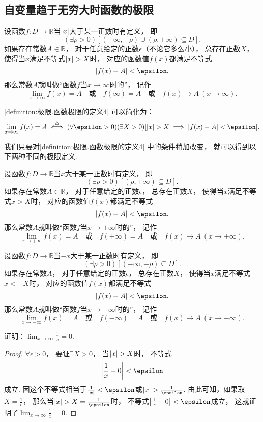 \subsection{自变量趋于无穷大时函数的极限}
\begin{definition}\label{definition:极限.函数极限的定义4}
设函数\(f\colon D\to\mathbb{R}\)当\(\abs{x}\)大于某一正数时有定义，
即\[
	(\exists\rho>0)
	[(-\infty,-\rho)\cup(\rho,+\infty) \subseteq D].
\]
如果存在常数\(A\in\mathbb{R}\)，
对于任意给定的正数\(\epsilon\)（不论它多么小），
总存在正数\(X\)，
使得当\(x\)满足不等式\(\abs{x} > X\)时，
对应的函数值\(f(x)\)都满足不等式\[
	\abs{f(x) - A} < \epsilon,
\]
那么常数\(A\)就叫做“函数\(f\)当\(x \to \infty\)时的”，
记作\[
	\lim_{x \to \infty} f(x) = A
	\quad\text{或}\quad
	f(\infty) = A
	\quad\text{或}\quad
	f(x) \to A\ (x \to \infty).
\]
\end{definition}
\cref{definition:极限.函数极限的定义4} 可以简化为：\[
	\lim_{x\to\infty} f(x) = A
	\defiff
	(\forall\epsilon>0)
	(\exists X>0)
	[
		\abs{x} > X
		\implies
		\abs{f(x) - A} < \epsilon
	].
\]

我们只要对\cref{definition:极限.函数极限的定义4} 中的条件稍加改变，
就可以得到以下两种不同的极限定义.
\begin{definition}\label{definition:极限.函数极限的定义5}
设函数\(f\colon D\to\mathbb{R}\)当\(x\)大于某一正数时有定义，
即\[
	(\exists\rho>0)
	[(\rho,+\infty) \subseteq D].
\]
如果存在常数\(A\in\mathbb{R}\)，
对于任意给定的正数\(\epsilon\)，
总存在正数\(X\)，
使得当\(x\)满足不等式\(x > X\)时，
对应的函数值\(f(x)\)都满足不等式\[
	\abs{f(x) - A} < \epsilon,
\]
那么常数\(A\)就叫做“函数\(f\)当\(x \to +\infty\)时的”，
记作\[
	\lim_{x \to +\infty} f(x) = A
	\quad\text{或}\quad
	f(+\infty) = A
	\quad\text{或}\quad
	f(x) \to A\ (x \to +\infty).
\]
\end{definition}

\begin{definition}\label{definition:极限.函数极限的定义6}
设函数\(f\colon D\to\mathbb{R}\)当\(-x\)大于某一正数时有定义，
即\[
	(\exists\rho>0)
	[(-\infty,-\rho) \subseteq D].
\]
如果存在常数\(A\)，
对于任意给定的正数\(\epsilon\)，
总存在正数\(X\)，
使得当\(x\)满足不等式\(x < -X\)时，
对应的函数值\(f(x)\)都满足不等式\[
	\abs{f(x) - A} < \epsilon,
\]
那么常数\(A\)就叫做“函数\(f\)当\(x \to -\infty\)时的”，
记作\[
	\lim_{x \to -\infty} f(x) = A
	\quad\text{或}\quad
	f(-\infty) = A
	\quad\text{或}\quad
	f(x) \to A\ (x \to -\infty).
\]
\end{definition}

\begin{example}
证明：\(\lim_{x\to\infty} \frac{1}{x} = 0\).
\begin{proof}
\(\forall\epsilon>0\)，
要证\(\exists X > 0\)，
当\(\abs{x}>X\)时，
不等式\[
	\abs{\frac{1}{x}-0}<\epsilon
\]成立.
因这个不等式相当于\(\frac{1}{\abs{x}}<\epsilon\)或\(\abs{x}>\frac{1}{\epsilon}\).
由此可知，如果取\(X=\frac{1}{\epsilon}\)，
那么当\(\abs{x}>X=\frac{1}{\epsilon}\)时，
不等式\(\abs{\frac{1}{x}-0}<\epsilon\)成立，
这就证明了\(\lim_{x\to\infty} \frac{1}{x} = 0\).
\end{proof}
\end{example}
